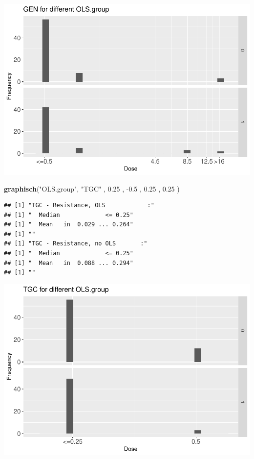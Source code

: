 \documentclass[
]{article}
\newenvironment{Shaded}{\begin{snugshade}}{\end{snugshade}}
\newcommand{\FloatTok}[1]{\textcolor[rgb]{0.00,0.00,0.81}{#1}}
\newcommand{\KeywordTok}[1]{\textcolor[rgb]{0.13,0.29,0.53}{\textbf{#1}}}
\newcommand{\NormalTok}[1]{#1}
\newcommand{\StringTok}[1]{\textcolor[rgb]{0.31,0.60,0.02}{#1}}
\begin{document}
\includegraphics{Verteilungen_files/figure-latex/unnamed-chunk-22-1.pdf}

\begin{Shaded}
\begin{Highlighting}[]
  \KeywordTok{graphisch}\NormalTok{(}\StringTok{"OLS.group"}\NormalTok{, }\StringTok{"TGC"}\NormalTok{ , }\FloatTok{0.25}\NormalTok{ ,  }\FloatTok{-0.5}\NormalTok{ ,   }\FloatTok{0.25}\NormalTok{ ,   }\FloatTok{0.25}\NormalTok{ )  }
\end{Highlighting}
\end{Shaded}

\begin{verbatim}
## [1] "TGC - Resistance, OLS            :"
## [1] "  Median             <= 0.25"
## [1] "  Mean   in  0.029 ... 0.264"
## [1] ""
## [1] "TGC - Resistance, no OLS       :"
## [1] "  Median             <= 0.25"
## [1] "  Mean   in  0.088 ... 0.294"
## [1] ""
\end{verbatim}

\includegraphics{Verteilungen_files/figure-latex/unnamed-chunk-23-1.pdf}
\end{document}
